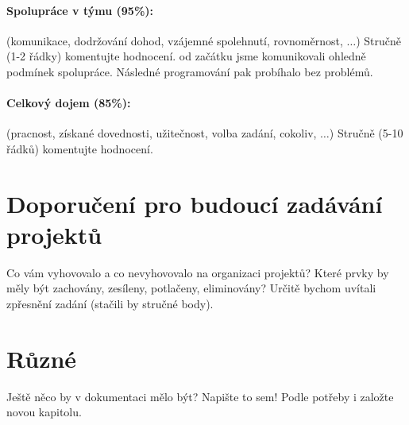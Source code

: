 \documentclass[12pt,a4paper,titlepage,final]{report}
\begin{document}
\paragraph{Spolupráce v týmu (95\%):} (komunikace, dodržování dohod, vzájemné
spolehnutí, rovnoměrnost, $\ldots$)
Stručně (1-2 řádky) komentujte hodnocení. 
od začátku jsme komunikovali ohledně podmínek spolupráce. Následné programování pak probíhalo bez problémů.

\paragraph{Celkový dojem (85\%):} (pracnost, získané dovednosti, užitečnost,
volba zadání, cokoliv, $\ldots$)
Stručně (5-10 řádků) komentujte hodnocení. 

\section{Doporučení pro budoucí zadávání projektů}

Co vám vyhovovalo a co nevyhovovalo na organizaci projektů? Které prvky by měly
být zachovány, zesíleny, potlačeny, eliminovány?
Určitě bychom uvítali zpřesnění zadání (stačili by stručné body).

\section{Různé}

Ještě něco by v dokumentaci mělo být? Napište to sem! Podle potřeby i založte
novou kapitolu.
\end{document}
